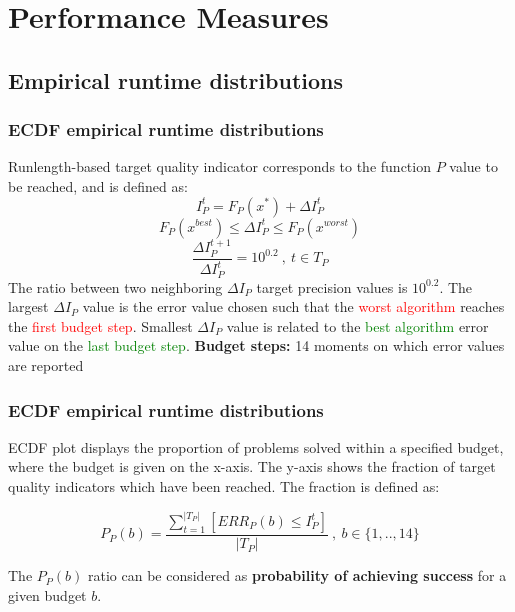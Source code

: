 \documentclass[hyperref={pdfpagelabels=false}]{beamer}
\begin{document}
\section{Performance Measures}
\subsection{Empirical runtime distributions}
\begin{frame}
\frametitle{ECDF empirical runtime distributions} 

Runlength-based target quality indicator corresponds to the function $P$ value to be reached, and is defined as:
\begin{equation*}
 I_P^{t} = F_P({x^*}) + \Delta I_P^{t}
\end{equation*}
\begin{equation*}
F_P(x^{best}) \leq  \Delta I_P^{t} \leq F_P(x^{worst})
\end{equation*}
\begin{equation*}
\frac{\Delta I_P^{t+1}}{\Delta I_P^{t}} = 10^{0.2} \ , \ t \in T_P 
\end{equation*}
The ratio between two neighboring $\Delta I_P$ target precision values is $10^{0.2}$. The largest $\Delta I_P$ value is the error value chosen such that the \textcolor{red}{worst algorithm} reaches the \textcolor{red}{first budget step}. Smallest $\Delta I_P$ value is related to the \textcolor{green}{best algorithm} error value on the \textcolor{green}{last budget step}.
\newline 
\newline
\textbf{Budget steps:} 14 moments on which error values are reported

%

\end{frame}

\begin{frame}
\frametitle{ECDF empirical runtime distributions} 

ECDF plot displays the proportion of problems solved within a specified budget, where the budget is given on the x-axis. The y-axis shows the fraction of target quality indicators which have been reached. The fraction is defined as:

\begin{equation*}
  P_P(b) = \frac{\sum_{t=1}^{|T_P|}[ ERR_P(b) \leq I_P^t]}{|T_P|} \ , \ b \in \{1,..,14\}
\end{equation*}

The $P_P(b)$ ratio can be considered as \textbf{probability of achieving success} for a given budget $b$.

\end{frame}
\end{document}
